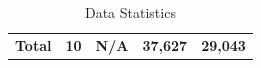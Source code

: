\documentclass[a4paper]{article}
\begin{document}
\begin{appendices}
\begin{table}[htbp]
\begin{tabular}{lcp{5.715em}cc}
    \textbf{Total} & \textbf{10} & \textbf{N/A} & \textbf{37,627} & \textbf{29,043} \\
    \end{tabular}%
  \caption{Data Statistics}
  \label{tab:datastats}%
\end{table}%

\end{appendices}
\end{document}
